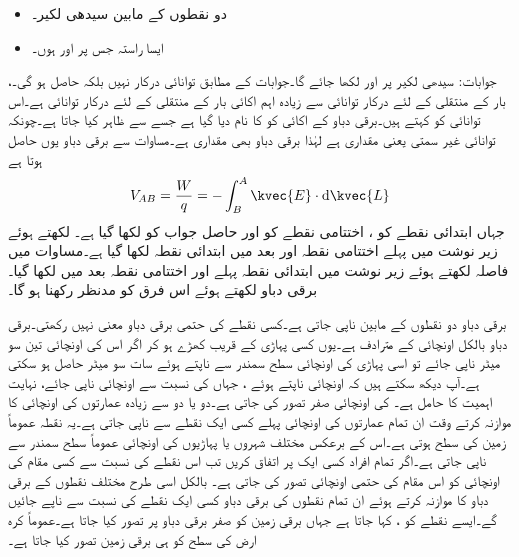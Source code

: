 \begin{itemize}
\item
دو نقطوں کے مابین سیدھی لکیر۔
\item
ایسا راستہ جس پر  اور  ہوں۔
\end{itemize}

جوابات: سیدھی لکیر پر  اور  لکھا جائے گا۔جوابات کے مطابق توانائی درکار نہیں بلکہ حاصل ہو گی۔،  
بار  کے منتقلی کے لئے درکار  توانائی سے زیادہ اہم  اکائی بار کے منتقلی کے لئے درکار توانائی ہے۔اس توانائی کو  کہتے  ہیں۔برقی دباو کے اکائی  کو  کا نام دیا گیا ہے جسے  سے ظاہر کیا جاتا ہے۔چونکہ توانائی غیر سمتی یعنی مقداری ہے لہٰذا برقی دباو بھی مقداری ہے۔مساوات  سے برقی دباو یوں حاصل ہوتا ہے
\begin{align}\label{مساوات_توانائی_برقی_دباو_تعریف}
V_{AB}=\frac{W}{q}=-\int_{B}^{A} \kvec{E} \cdot \dif\kvec{L}
\end{align}
جہاں ابتدائی نقطے کو ، اختتامی نقطے کو  اور حاصل جواب کو  لکھا گیا ہے۔ لکھتے ہوئے زیر نوشت میں پہلے اختتامی نقطہ   اور بعد میں ابتدائی نقطہ  لکھا گیا ہے۔مساوات  میں فاصلہ  لکھتے ہوئے زیر نوشت میں ابتدائی نقطہ  پہلے اور اختتامی نقطہ  بعد میں لکھا گیا۔برقی دباو   لکھتے ہوئے اس فرق کو مدنظر رکھنا ہو گا۔

برقی دباو دو نقطوں کے مابین ناپی جاتی ہے۔کسی نقطے کی حتمی برقی دباو معنی نہیں رکھتی۔برقی دباو بالکل اونچائی کے مترادف ہے۔یوں کسی پہاڑی کے قریب کھڑے ہو کر اگر اس کی اونچائی تین سو میٹر ناپی جائے تو اسی پہاڑی کی اونچائی سطح سمندر سے ناپتے ہوئے سات سو میٹر حاصل ہو سکتی ہے۔آپ دیکھ سکتے ہیں کہ اونچائی ناپتے ہوئے ، جہاں کی نسبت سے اونچائی ناپی جائے، نہایت اہمیت کا حامل  ہے۔ کی اونچائی صفر تصور کی جاتی ہے۔دو یا دو سے زیادہ  عمارتوں کی اونچائی کا موازنہ کرتے وقت ان تمام عمارتوں کی اونچائی پہلے کسی ایک نقطے سے ناپی جاتی ہے۔یہ نقطہ عموماً زمین کی سطح ہوتی ہے۔اس کے برعکس مختلف شہروں یا پہاڑیوں کی اونچائی عموماً سطح سمندر سے ناپی جاتی ہے۔اگر تمام افراد کسی ایک  پر اتفاق کریں تب اس نقطے کی نسبت سے کسی مقام کی اونچائی کو اس مقام کی حتمی اونچائی تصور کی جاتی ہے۔ بالکل اسی طرح مختلف نقطوں کے برقی دباو کا موازنہ کرتے ہوئے ان تمام نقطوں کی برقی دباو کسی ایک نقطے کی نسبت سے ناپے جائیں گے۔ایسے نقطے کو ، کہا جاتا ہے جہاں برقی زمین کو صفر  برقی دباو پر تصور کیا جاتا ہے۔عموماً کرہ ارض کی سطح کو ہی برقی زمین تصور کیا جاتا ہے۔

